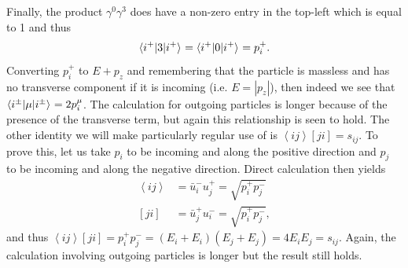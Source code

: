 Finally, the product $\gamma^0 \gamma^3$ does have a non-zero entry in the top-left which is equal to 1 and thus
\begin{equation}
\mathinner{\langle i^+\vert3\vert i^+\rangle}_{} = \mathinner{\langle i^+\vert0\vert i^+\rangle}_{} =  p_i^+.
\end{equation}
Converting $p_i^+$ to $E + p_z$ and remembering that the particle is massless and has no transverse component if it is incoming (i.e. $E = |p_z|$), then indeed we see that $\mathinner{\langle i^\pm\vert\mu\vert i^\pm\rangle}_{} = 2p_i^\mu$. The calculation for outgoing particles is longer because of the presence of the transverse term, but again this relationship is seen to hold. The other identity we will make particularly regular use of is $\left<i j \right> [ji] = s_{ij}$. To prove this, let us take $p_i$ to be incoming and along the positive direction and $p_j$ to be incoming and along the negative direction. Direct calculation then yields
\begin{equation}
\begin{split}
\left< i j \right> &= \bar{u}_i^- u_j^+ = \sqrt{p_i^+ p_j^-} \\
[ j i] &= \bar{u}_j^+ u_i^- = \sqrt{p_i^+ p_j^-},
\end{split}
\end{equation}
and thus $\left<i j \right> [ji] = p_i^+ p_j^- = (E_i + E_i)(E_j + E_j) = 4 E_i E_j = s_{ij}$. Again, the calculation involving outgoing particles is longer but the result still holds. 

